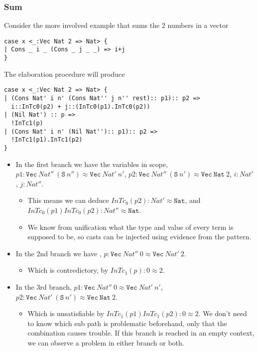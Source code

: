 \subsubsection{Sum}

Consider the more involved example that sums the 2 numbers in a vector

\begin{lstlisting}[basicstyle={\ttfamily\small}]
case x <_:Vec Nat 2 => Nat> {
| Cons _ i _ (Cons _ j _ _) => i+j
}
\end{lstlisting}

The elaboration procedure will produce

\begin{lstlisting}[basicstyle={\ttfamily\small}]
case x <_:Vec Nat 2 => Nat> {
| (Cons Nat' i n' (Cons Nat'' j n'' rest):: p1):: p2 => 
  i::InTc0(p2) + j::(InTc0(p1).InTc0(p2))
| (Nil Nat') :: p => 
  !InTc1(p)
| (Cons Nat' i n' (Nil Nat''):: p1):: p2 =>
  !InTc1(p1).InTc1(p2) 
}
\end{lstlisting}

\begin{itemize}
\item
In the first branch we have the variables in scope, $p1:\mathtt{Vec}\ Nat''\ (\mathtt{S}\ n'')\approx\mathtt{Vec}\ Nat'\ n'$, $p2:\mathtt{Vec}\ Nat''\ (\mathtt{S}\ n')\approx\mathtt{Vec}\ \mathtt{Nat}\ 2$, $i:Nat'$, $j:Nat''$.
\begin{itemize}
\item 
This means we can deduce $InTc_{0}(p2):Nat'\approx\mathtt{Nat}$, and $InTc_{0}(p1)InTc_{0}(p2):Nat''\approx\mathtt{Nat}$.
\item 
We know from unification what the type and value of every term is supposed to be, so casts can be injected using evidence from the pattern.
\end{itemize}
\item 
In the 2nd branch we have , $p:\mathtt{Vec}\ Nat''\ 0\approx\mathtt{Vec}\ Nat'\ 2$.
\begin{itemize}
\item 
Which is contredictory, by $InTc_{1}(p):0\approx2$.
\end{itemize}
\item 
{}
In the 3rd branch, $p1:\mathtt{Vec}\ Nat''\ 0\approx\mathtt{Vec}\ Nat'\ n'$, $p2:\mathtt{Vec}\ Nat'\ (\mathtt{S}\ n')\approx\mathtt{Vec}\ \mathtt{Nat}\ 2$. 
\begin{itemize}
\item
Which is unsatisfiable by $InTc_{1}(p1)InTc_{1}(p2):0\approx2$.
We don't need to know which sub path is problematic beforehand, only that the combination causes trouble.
If this branch is reached in an empty context, we can observe a problem in either branch or both.
\end{itemize}
\end{itemize}

